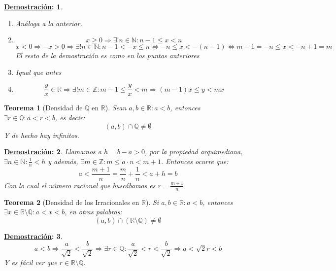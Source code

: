\documentclass[10pt,a4paper,openright]{book}
\theoremstyle{break}
\newtheorem*{theo}{Teorema}
\newtheorem*{demo}{\underline{Demostración}:}
\begin{document}
\begin{demo}
\begin{enumerate}
Por último hay que ver que son disjuntos dos a dos:
$$n,m\in \mathbb N: n\neq m\Rightarrow n<m\Rightarrow n+1\leq m\Rightarrow n\leq m-1\Rightarrow [n-1,n)\cap [m-1,m)\neq \emptyset$$
Esto es así porque $x\in [n-1,n)\Rightarrow x<n$ y $x\in [m-1,m)\Rightarrow x\geq m+1$, todo implica que $m-1<n$ \#
\item Análoga a la anterior.
\item $$x\geq 0\Rightarrow \exists! n \in \mathbb N : n-1\leq x<n$$
$$x<0\Rightarrow -x>0 \Rightarrow \exists! n \in \mathbb N: n-1<-x\leq n\Leftrightarrow -n\leq x< -(n-1)\Leftrightarrow m-1=-n\leq x< -n+1=m$$
El resto de la demostración es como en los puntos anteriores
\item Igual que antes
\item $$\frac{y}{x}\in \mathbb R\Rightarrow \exists! m \in \mathbb Z: m-1\leq \frac{y}{x}< m\Rightarrow (m-1)x\leq y< mx$$
\end{enumerate}
\end{demo}

\begin{theo}[Densidad de $\mathbb Q$ en $\mathbb R$]
Sean $a,b\in \mathbb R: a<b$, entonces $\exists r\in \mathbb Q: a<r<b$, es decir:
$$(a,b)\cap \mathbb Q\neq \emptyset$$
Y de hecho hay infinitos.
\end{theo}
\begin{demo}
Llamamos a $h=b-a>0$, por la propiedad arquimediana, $\exists n \in \mathbb N: \frac{1}{n}<h$ y además, $\exists m \in \mathbb Z: m\leq a\cdot n< m+1$. Entonces ocurre que:
$$a<\frac{m+1}{n}=\frac{m}{n}+\frac{1}{n}< a+ h=b$$
Con lo cual el número racional que buscábamos es $r=\frac{m+1}{n}$.
\end{demo}

\begin{theo}[Densidad de los Irracionales en $\mathbb R$]
Si $a,b\in \mathbb R: a<b$, entonces $\exists x\in \mathbb R\mbox{\textbackslash} \mathbb Q: a<x<b$, en otras palabras:
$$(a,b)\cap (\mathbb R\mbox{\textbackslash} \mathbb Q)\neq \emptyset$$
\end{theo}
\begin{demo}
$$a<b\Rightarrow \frac{a}{\sqrt{2}}< \frac{b}{\sqrt{2}}\Rightarrow \exists r \in \mathbb Q: \frac{a}{\sqrt{2}}<r<\frac{b}{\sqrt{2}}\Rightarrow a <\sqrt{2}r<b$$
Y es fácil ver que $r\in \mathbb R\mbox{\textbackslash}\mathbb Q$.
\end{demo}
\end{document}
